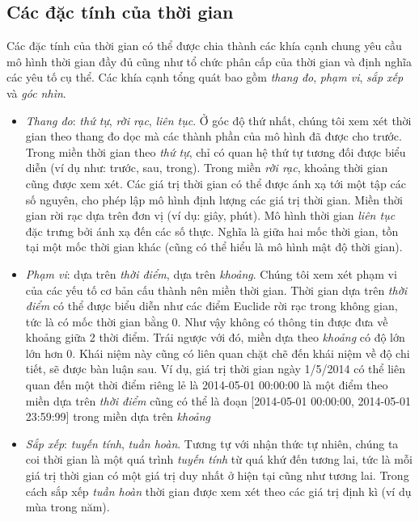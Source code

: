 \subsection{Các đặc tính của thời gian}
Các đặc tính của thời gian có thể được chia thành các khía cạnh chung yêu cầu mô hình thời gian đầy đủ cũng như tổ chức phân cấp của thời gian và định nghĩa các yêu tố cụ thể. Các khía cạnh tổng quát bao gồm \textit{thang đo}, \textit{phạm vi}, \textit{sắp xếp} và \textit{góc nhìn}.
\begin{itemize}
    \item \textit{Thang đo}: \textit{thứ tự}, \textit{rời rạc}, \textit{liên tục}. Ở góc độ thứ nhất, chúng tôi xem xét thời gian theo thang đo dọc mà các thành phần của mô hình đã được cho trước. Trong miền thời gian theo \textit{thứ tự}, chỉ có quan hệ thứ tự tương đối được biểu diễn (ví dụ như: trước, sau, trong). Trong miền \textit{rời rạc}, khoảng thời gian cũng được xem xét. Các giá trị thời gian có thể được ánh xạ tới một tập các số nguyên, cho phép lập mô hình định lượng các giá trị thời gian. Miền thời gian rời rạc dựa trên đơn vị (ví dụ: giây, phút). Mô hình thời gian \textit{liên tục} đặc trưng bởi ánh xạ đến các số thực. Nghĩa là giữa hai mốc thời gian, tồn tại một mốc thời gian khác (cũng có thể hiểu là mô hình mật độ thời gian).
    \item \textit{Phạm vi}: dựa trên \textit{thời điểm}, dựa trên \textit{khoảng}. Chúng tôi xem xét phạm vi của các yếu tố cơ bản cấu thành nên miền thời gian. Thời gian dựa trên \textit{thời điểm} có thể được biểu diễn như các điểm Euclide rời rạc trong không gian, tức là có mốc thời gian bằng 0. Như vậy không có thông tin được đưa về khoảng giữa 2 thời điểm. Trái ngược với đó, miền dựa theo \textit{khoảng} có độ lớn lớn hơn 0. Khái niệm này cũng có liên quan chặt chẽ đến khái niệm về độ chi tiết, sẽ được bàn luận sau. Ví dụ, giá trị thời gian ngày 1/5/2014 có thể liên quan đến một thời điểm riêng lẻ là 2014-05-01 00:00:00 là một điểm theo miền dựa trên \textit{thời điểm} cũng có thể là đoạn [2014-05-01 00:00:00, 2014-05-01 23:59:99] trong miền dựa trên \textit{khoảng}
    \item \textit{Sắp xếp}: \textit{tuyến tính}, \textit{tuần hoàn}. Tương tự với nhận thức tự nhiên, chúng ta coi thời gian là một quá trình \textit{tuyến tính} từ quá khứ đến tương lai, tức là mỗi giá trị thời gian có một giá trị duy nhất ở hiện tại cũng như tương lai. Trong cách sắp xếp \textit{tuần hoàn} thời gian được xem xét theo các giá trị định kì (ví dụ mùa trong năm).

\end{itemize}
